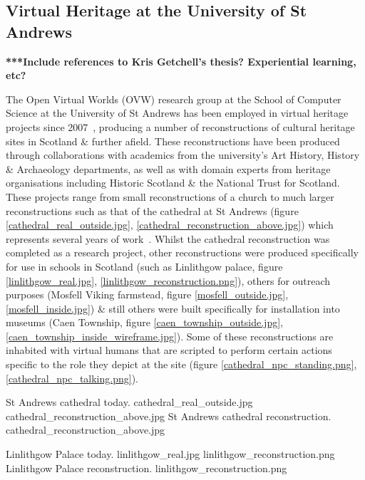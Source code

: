 
\subsection{Virtual Heritage at the University of St Andrews}

\textbf{***Include references to Kris Getchell's thesis? Experiential learning, etc?}

The Open Virtual Worlds (OVW) research group at the School of Computer Science at the University of St Andrews has been employed in virtual heritage projects since 2007~\cite{Getchell2007}, producing a number of reconstructions of cultural heritage sites in Scotland \& further afield. These reconstructions have been produced through collaborations with academics from the university's Art History, History \& Archaeology departments, as well as with domain experts from heritage organisations including Historic Scotland \& the National Trust for Scotland. These projects range from small reconstructions of a church to much larger reconstructions such as that of the cathedral at St Andrews (figure \ref{cathedral_real_outside.jpg}, \ref{cathedral_reconstruction_above.jpg}) which represents several years of work~\cite{Kennedy2013}. Whilst the cathedral reconstruction was completed as a research project, other reconstructions were produced specifically for use in schools in Scotland (such as Linlithgow palace, figure \ref{linlithgow_real.jpg}, \ref{linlithgow_reconstruction.png}), others for outreach purposes (Mosfell Viking farmstead, figure \ref{mosfell_outside.jpg}, \ref{mosfell_inside.jpg}) \& still others were built specifically for installation into museums (Caen Township, figure \ref{caen_township_outside.jpg}, \ref{caen_township_inside_wireframe.jpg}). Some of these reconstructions are inhabited with virtual humans that are scripted to perform certain actions specific to the role they depict at the site (figure \ref{cathedral_npc_standing.png}, \ref{cathedral_npc_talking.png}).

 {St Andrews cathedral today.} {cathedral_real_outside.jpg}
       {cathedral_reconstruction_above.jpg} {St Andrews cathedral reconstruction.} {cathedral_reconstruction_above.jpg}

 {Linlithgow Palace today.} {linlithgow_real.jpg}
       {linlithgow_reconstruction.png} {Linlithgow Palace reconstruction.} {linlithgow_reconstruction.png}

